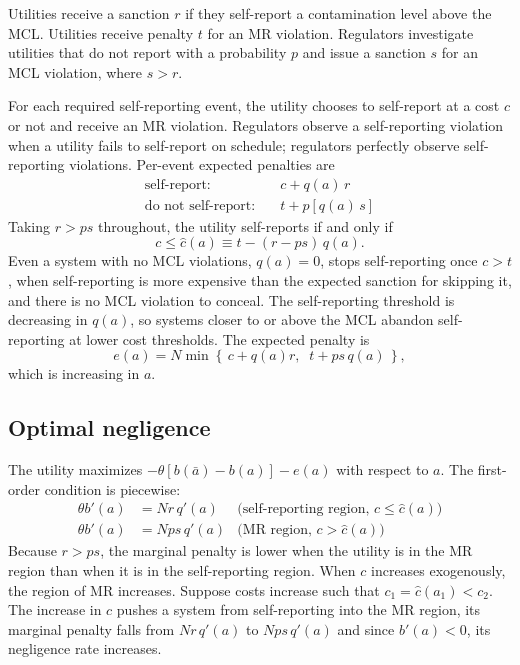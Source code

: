 Utilities receive a sanction $r$ if they self-report a contamination level above the MCL. Utilities receive penalty $t$ for an MR violation. Regulators investigate utilities that do not report with a probability $p$ and issue a sanction $s$ for an MCL violation, where $s>r$.


For each required self-reporting event, the utility chooses to self-report at a cost $c$ or not and receive an MR violation. Regulators observe a self-reporting violation when a utility fails to self-report on schedule; regulators perfectly observe self-reporting violations. Per-event expected penalties are
\begin{align*}
\text{self-report:} \quad & c + q(a)\,r \\
\text{do not self-report:} \quad & t + p\left[q(a)\,s\right]
\end{align*}
Taking $r > ps$ throughout, the utility self-reports if and only if
\begin{equation}\label{eq:chat}
c \le \hat{c}(a) \equiv t - (r - ps)\,q(a).
\end{equation}
Even a system with no MCL violations, $q(a) = 0$, stops self-reporting once $c > t$, when self-reporting is more expensive than the expected sanction for skipping it, and there is no MCL violation to conceal. The self-reporting threshold is decreasing in $q(a)$, so systems closer to or above the MCL abandon self-reporting at lower cost thresholds. The expected penalty is
\begin{equation}\label{eq:endog_penalty}
e(a) = N \min\left\{\, c + q(a)r,\;\; t + ps\,q(a) \,\right\},
\end{equation}
which is increasing in $a$.

\subsection{Optimal negligence}

The utility maximizes $-\theta[b(\bar{a}) - b(a)] - e(a)$ with respect to $a$. The first-order condition is piecewise:
\begin{align}
\theta b'(a) &= N r\, q'(a) & \text{(self-reporting region, } c \le \hat{c}(a)) \\
\theta b'(a) &= N ps\, q'(a) & \text{(MR region, } c > \hat{c}(a))
\end{align}
Because $r > ps$, the marginal penalty is lower when the utility is in the MR region than when it is in the self-reporting region. When $c$ increases exogenously, the region of MR increases. Suppose costs increase such that $c_1 =\hat{c}(a_1) < c_2$. The increase in $c$ pushes a system from self-reporting into the MR region, its marginal penalty falls from $Nr\,q'(a)$ to $Nps\,q'(a)$ and since $b'(a)<0$, its negligence rate increases.

